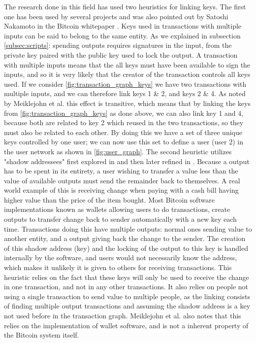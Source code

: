 The research done in this field has used two heuristics for linking keys. The first one has been used by several projects \cite{reid2013analysis,meiklejohn2013fistful,androulaki2013evaluating,ron2013quantitative} and was also pointed out by Satoshi Nakamoto in the Bitcoin whitepaper \cite{nakamoto2008bitcoin}. Keys used in transactions with multiple inputs can be said to belong to the same entity. As we explained in subsection \cref{subsec:scripts}: spending outputs requires signatures in the input, from the private key paired with the public key used to lock the output. A transaction with multiple inputs means that the all keys must have been available to sign the inputs, and so it is very likely that the creator of the transaction controls all keys used. If we consider \cref{fig:transaction_graph_keys} we have two transactions with multiple inputs, and we can therefore link keys 1 \& 2, and keys 2 \& 4. As noted by Meiklejohn et al. \cite{meiklejohn2013fistful} this effect is transitive, which means that by linking the keys from \cref{fig:transaction_graph_keys} as done above, we can also link key 1 and 4, because both are related to key 2 which reused in the two transactions, so they must also be related to each other. By doing this we have a set of three unique keys controlled by one user; we can now use this set to define a user (user 2) in the user network as shown in \cref{fig:user_graph}. The second heuristic utilizes "shadow addressees" first explored in \cite{androulaki2013evaluating} and then later refined in \cite{meiklejohn2013fistful}. Because a output has to be spent in its entirety, a user wishing to transfer a value less than the value of available outputs must send the remainder back to themselves. A real world example of this is receiving change when paying with a cash bill having higher value than the price of the item bought. Most Bitcoin software implementations known as wallets allowing users to do transactions, create outputs to transfer change back to sender automatically with a new key each time. Transactions doing this have multiple outputs: normal ones sending value to another entity, and a output giving back the change to the sender. The creation of this shadow address (key) and the locking of the output to this key is handled internally by the software, and users would not necessarily know the address, which makes it unlikely it is given to others for receiving transactions. This heuristic relies on the fact that these keys will only be used to receive the change in one transaction, and not in any other transactions. It also relies on people not using a single transaction to send value to multiple people, as the linking consists of finding multiple output transactions and assuming the shadow address is a key not used before in the transaction graph. Meiklejohn et al. \cite{meiklejohn2013fistful} also notes that this relies on the implementation of wallet software, and is not a inherent property of the Bitcoin system itself. 
